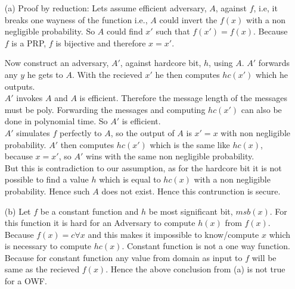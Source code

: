 \begin{itemize}
    \item [(a)] Proof by reduction:
Lets assume efficient adversary, $A$, against $f$, i.e, it breaks one wayness of
the function i.e., $A$ could invert the $f(x)$ with a non negligible probability.
So $A$ could find $x'$ such that $f(x') = f(x)$. 
Because \(f\) is a PRP, \(f\) is bijective and therefore \(x = x'\).


Now construct an adversary, $A'$, against hardcore bit, $h$, using $A$. 
\(A'\) forwards any \(y\) he gets to \(A\). With the recieved \(x'\) he then computes \(hc(x')\) which he outputs. \\
\(A'\) invokes \(A\) and \(A\) is efficient. Therefore the message length of the messages must be poly. Forwarding the messages and computing \(hc(x')\) can also be done in polynomial time. So \(A'\) is efficient.\\
\(A'\) simulates \(f\) perfectly to \(A\), so the output of \(A\) is \(x' = x\) with non negligible probability. \(A'\) then computes \(hc(x')\) which is the same like \(hc(x)\), because \(x = x'\), so \(A'\) wins with the same non negligible probability. \\
But this is contradiction to our assumption, as for the hardcore bit it is not possible to find a value \(h\) which is equal to $hc(x)$ with a  non negligible probability. Hence such $A$ does not exist. Hence this contrunction is secure.

    \item [(b)] Let $f$ be a constant function and $h$ be most significant bit, $msb(x)$.
  For this function it is hard for an Adversary to compute $h(x)$ from $f(x)$. Because \(f(x) = c \forall x\) and this makes it impossible to know/compute \(x\) which is necessary to compute \(hc(x)\). 
  Constant function is not a one way function. Because for constant function any value from domain
  as input to $f$ will be same as the recieved $f(x)$. Hence the above conclusion from (a) is not true for a OWF.
\end{itemize}